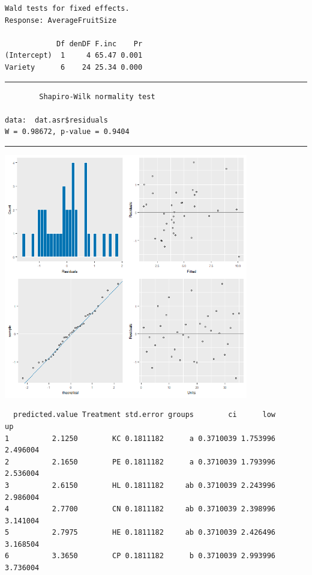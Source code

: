 \documentclass[a4paper, 10pt, fleqn, twosided]{memoir}
\begin{document}
\begin{tcolorbox}[title = Exercise 9 output]
\begin{verbatim}
Wald tests for fixed effects.
Response: AverageFruitSize

            Df denDF F.inc    Pr
(Intercept)  1     4 65.47 0.001
Variety      6    24 25.34 0.000
\end{verbatim}
{\color{outpt} {\hrule height 1pt}}
\begin{verbatim}
        Shapiro-Wilk normality test

data:  dat.asr$residuals
W = 0.98672, p-value = 0.9404
\end{verbatim}
{\color{outpt} {\hrule height 1pt}}
\vspace{0.2cm}
\includegraphics[width=0.8\textwidth, frame]{Exercise9Resplot.png}
\end{tcolorbox}

\begin{tcolorbox}[title = Exercise 9 output continued]
\begin{verbatim}
  predicted.value Treatment std.error groups        ci      low       up
1          2.1250        KC 0.1811182      a 0.3710039 1.753996 2.496004
2          2.1650        PE 0.1811182      a 0.3710039 1.793996 2.536004
3          2.6150        HL 0.1811182     ab 0.3710039 2.243996 2.986004
4          2.7700        CN 0.1811182     ab 0.3710039 2.398996 3.141004
5          2.7975        HE 0.1811182     ab 0.3710039 2.426496 3.168504
6          3.3650        CP 0.1811182      b 0.3710039 2.993996 3.736004

\end{verbatim}
\end{tcolorbox}
\end{document}

